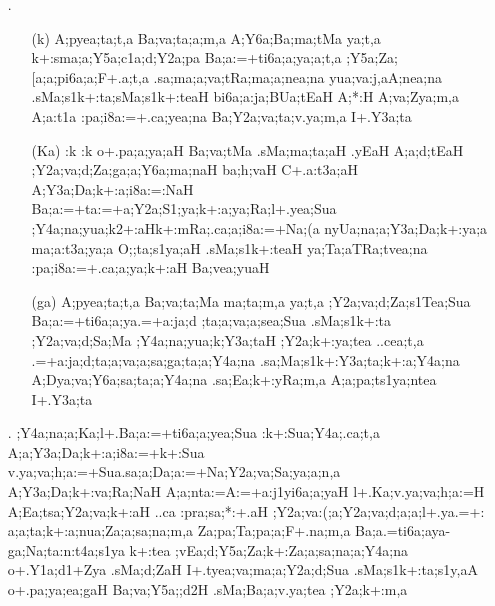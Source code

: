 \begin{spacing}{1.15}
\begin{itemize}
\item[{\sktf 4}.] \begin{itemize}
  \item[({\sktf k})] {\sktf A;pyea;ta;t,a Ba;va;ta;a;m,a A;Y6a;Ba;ma;tMa
ya;t,a k+:sma;a;Y5a;c1a;d;Y2a;pa Ba;a:=+ti6a;a;ya;a;t,a
;Y5a;Za;[a;a;pi6a;a;F+.a;t,a .sa;ma;a;va;tRa;ma;a;nea;na yua;va:j,aA;nea;na .sMa;s1k+:ta;sMa;s1k+:teaH%
 bi6a;a:ja;BUa;tEaH A;*:H%
 A;va;Zya;m,a A;a:t1a :pa;i8a:=+.ca;yea;na Ba;Y2a;va;ta;v.ya;m,a
I+.Y3a;ta}
                
   \item[({\sktf Ka})] {\sktf :k :k o+.pa;a;ya;aH
Ba;va;tMa .sMa;ma;ta;aH .yEaH A;a;d;tEaH
;Y2a;va;d;Za;ga;a;Y6a;ma;naH ba;h;vaH C+.a:t3a;aH
A;Y3a;Da;k+:a;i8a:=:NaH\ZF{,} Ba;a:=+ta:=+a;Y2a;S1;ya;k+:a;ya;Ra;l+.yea;Sua
;Y4a;na;yua;k2+:aH\break k+:mRa;.ca;a;i8a:=+Na;(a\ZF{,}
nyUa;na;a;Y3a;Da;k+:ya;a ma;a:t3a;ya;a O;;ta;s1ya;aH
.sMa;s1k+:teaH ya;Ta;aTRa;tvea;na :pa;i8a:=+.ca;a;ya;k+:aH Ba;vea;yuaH}
                
 \item[({\sktf ga})] {\sktf A;pyea;ta;t,a Ba;va;ta;Ma ma;ta;m,a\ZF{,} ya;t,a
;Y2a;va;d;Za;s1Tea;Sua Ba;a:=+ti6a;a;ya\ZF{-}.=+a:ja;d%
;ta;a;va;a;sea;Sua .sMa;s1k+:ta
;Y2a;va;d;Sa;Ma ;Y4a;na;yua;k;Y3a;taH ;Y2a;k+:ya;tea ..cea;t,a\ZF{,}
.=+a:ja;d;ta;a;va;a;sa;ga;ta;a;Y4a;na .sa;Ma;s1k+:Y3a;ta;k+:a;Y4a;na A;Dya;va;Y6a;sa;ta;a;Y4a;na .sa;Ea;k+:yRa;m,a
A;a;pa;ts1ya;ntea I+.Y3a;ta}
\end{itemize} 
           
 \item[{\sktf 5}.]  {\sktf ;Y4a;na;a;Ka;l+.Ba;a:=+ti6a;a;yea;Sua
:k+:Sua;Y4a;.ca;t,a A;a;Y3a;Da;k+:a;i8a:=+k+:Sua
v.ya;va;h;a:=+Sua\ZF{-}.sa;a;Da;a:=+Na;Y2a;va;Sa;ya;a;n,a
A;Y3a;Da;k+:va;Ra;NaH A;a;nta:=A:=+a:j1yi6a;a;yaH l+.Ka;v.ya;va;h;a:=H\ZF{,}
A;Ea;tsa;Y2a;va;k+:aH ..ca :pra;sa;*:+.aH
;Y2a;va:(;a;Y2a;va;d;a;a;l+.ya\ZF{-}.=+:%
a;a;ta;k+:a;nua;Za;a;sa;na;m,a\ZF{,} Za;pa;Ta;pa;a;F+.na;m,a}
 {\sktf Ba;a}{\sktf .=}{\sktf ti6a;a}{\sktf ya}-{\sktf ga;Na;ta:n:t4a;s1ya
k+:tea ;vEa;d;Y5a;Za;k+:Za;a;sa;na;a;Y4a;na
o+.Y1a;d1+Zya .sMa;d;ZaH\ZF{,} I+.tyea;va;ma;a;Y2a;d;Sua%
\ZF{-}.sMa;s1k+:ta;s1y,aA o+.pa;ya;ea;gaH Ba;va;Y5a;;d2H
.sMa;Ba;a;v.ya;tea ;Y2a;k+:m,a}
 

\end{itemize}
\end{spacing}
